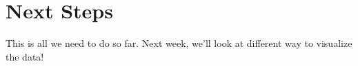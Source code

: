 \documentclass{article}\usepackage[]{graphicx}\usepackage[]{xcolor}
\begin{document}
\section{Next Steps}

This is all we need to do so far. Next week, we'll look at different way to visualize the data!
\end{document}
